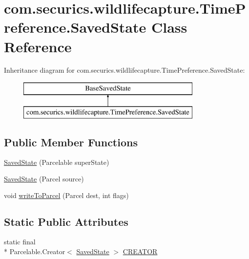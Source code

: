 \hypertarget{classcom_1_1securics_1_1wildlifecapture_1_1_time_preference_1_1_saved_state}{\section{com.\+securics.\+wildlifecapture.\+Time\+Preference.\+Saved\+State Class Reference}
\label{classcom_1_1securics_1_1wildlifecapture_1_1_time_preference_1_1_saved_state}
}
Inheritance diagram for com.\+securics.\+wildlifecapture.\+Time\+Preference.\+Saved\+State\+:\begin{figure}[H]
\begin{center}
\leavevmode
\includegraphics[height=2.000000cm]{classcom_1_1securics_1_1wildlifecapture_1_1_time_preference_1_1_saved_state}
\end{center}
\end{figure}
\subsection*{Public Member Functions}
\begin{DoxyCompactItemize}
\item 
\hyperlink{classcom_1_1securics_1_1wildlifecapture_1_1_time_preference_1_1_saved_state_a99fd66552ded31ee628ea13829e4459a}{Saved\+State} (Parcelable super\+State)
\item 
\hyperlink{classcom_1_1securics_1_1wildlifecapture_1_1_time_preference_1_1_saved_state_a05457d64d80dd28ad28347498f83f7ff}{Saved\+State} (Parcel source)
\item 
void \hyperlink{classcom_1_1securics_1_1wildlifecapture_1_1_time_preference_1_1_saved_state_a83bc7449e4261d417bf927d34b2ca122}{write\+To\+Parcel} (Parcel dest, int flags)
\end{DoxyCompactItemize}
\subsection*{Static Public Attributes}
\begin{DoxyCompactItemize}
\item 
static final \\*
Parcelable.\+Creator$<$ \hyperlink{classcom_1_1securics_1_1wildlifecapture_1_1_time_preference_1_1_saved_state}{Saved\+State} $>$ \hyperlink{classcom_1_1securics_1_1wildlifecapture_1_1_time_preference_1_1_saved_state_a88689bd7248417c21799b607bf25c2dd}{C\+R\+E\+A\+T\+O\+R}
\end{DoxyCompactItemize}


